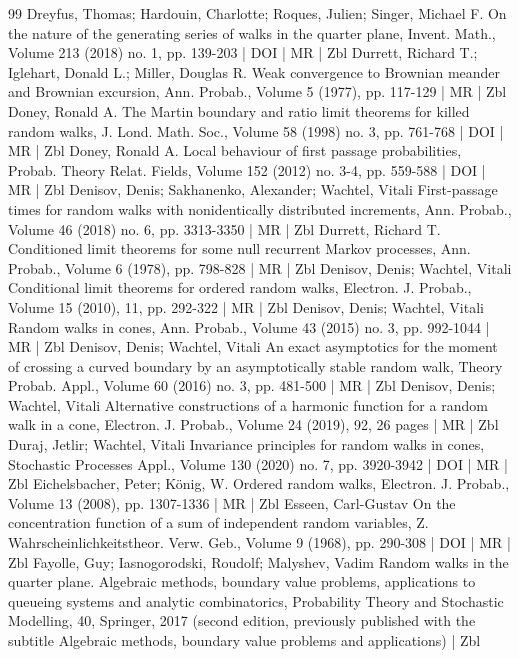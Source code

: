 \documentclass[10pt]{amsart}
\theoremstyle{definition}\newtheorem{defi}[theo]{Definition}\newtheorem{rema}[theo]{Remark}\newtheorem{exam}[theo]{Example}\newtheorem{exem}[theo]{Example}\newtheorem{nota}[theo]{Notation}
\begin{document}
\begin{thebibliography}{99}
Dreyfus, Thomas; Hardouin, Charlotte; Roques, Julien; Singer, Michael F. On the nature of the generating series of walks in the quarter plane, Invent. Math., Volume 213 (2018) no. 1, pp. 139-203 | DOI | MR | Zbl
Durrett, Richard T.; Iglehart, Donald L.; Miller, Douglas R. Weak convergence to Brownian meander and Brownian excursion, Ann. Probab., Volume 5 (1977), pp. 117-129 | MR | Zbl
Doney, Ronald A. The Martin boundary and ratio limit theorems for killed random walks, J. Lond. Math. Soc., Volume 58 (1998) no. 3, pp. 761-768 | DOI | MR | Zbl
Doney, Ronald A. Local behaviour of first passage probabilities, Probab. Theory Relat. Fields, Volume 152 (2012) no. 3-4, pp. 559-588 | DOI | MR | Zbl
Denisov, Denis; Sakhanenko, Alexander; Wachtel, Vitali First-passage times for random walks with nonidentically distributed increments, Ann. Probab., Volume 46 (2018) no. 6, pp. 3313-3350 | MR | Zbl
Durrett, Richard T. Conditioned limit theorems for some null recurrent Markov processes, Ann. Probab., Volume 6 (1978), pp. 798-828 | MR | Zbl
Denisov, Denis; Wachtel, Vitali Conditional limit theorems for ordered random walks, Electron. J. Probab., Volume 15 (2010), 11, pp. 292-322 | MR | Zbl
Denisov, Denis; Wachtel, Vitali Random walks in cones, Ann. Probab., Volume 43 (2015) no. 3, pp. 992-1044 | MR | Zbl
Denisov, Denis; Wachtel, Vitali An exact asymptotics for the moment of crossing a curved boundary by an asymptotically stable random walk, Theory Probab. Appl., Volume 60 (2016) no. 3, pp. 481-500 | MR | Zbl
Denisov, Denis; Wachtel, Vitali Alternative constructions of a harmonic function for a random walk in a cone, Electron. J. Probab., Volume 24 (2019), 92, 26 pages | MR | Zbl
Duraj, Jetlir; Wachtel, Vitali Invariance principles for random walks in cones, Stochastic Processes Appl., Volume 130 (2020) no. 7, pp. 3920-3942 | DOI | MR | Zbl
Eichelsbacher, Peter; König, W. Ordered random walks, Electron. J. Probab., Volume 13 (2008), pp. 1307-1336 | MR | Zbl
Esseen, Carl-Gustav On the concentration function of a sum of independent random variables, Z. Wahrscheinlichkeitstheor. Verw. Geb., Volume 9 (1968), pp. 290-308 | DOI | MR | Zbl
Fayolle, Guy; Iasnogorodski, Roudolf; Malyshev, Vadim Random walks in the quarter plane. Algebraic methods, boundary value problems, applications to queueing systems and analytic combinatorics, Probability Theory and Stochastic Modelling, 40, Springer, 2017 (second edition, previously published with the subtitle Algebraic methods, boundary value problems and applications) | Zbl

\end{thebibliography}
\end{document}
